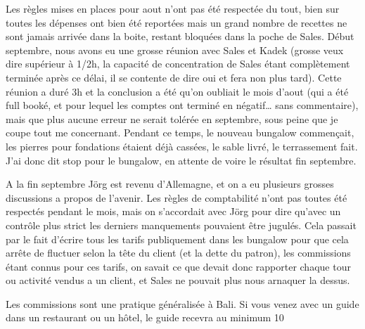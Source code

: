 Les règles mises en places pour aout n’ont pas été respectée du tout, bien sur toutes les dépenses ont bien été reportées mais un grand nombre de recettes ne sont jamais arrivée dans la boite, restant bloquées dans la poche de Sales. Début septembre, nous avons eu une grosse réunion avec Sales et Kadek (grosse veux dire supérieur à 1/2h, la capacité de concentration de Sales étant complètement terminée après ce délai, il se contente de dire oui et fera non plus tard). Cette réunion a duré 3h et la conclusion a été qu’on oubliait le mois d’aout (qui a été full booké, et pour lequel les comptes ont terminé en négatif… sans commentaire), mais que plus aucune erreur ne serait tolérée en septembre, sous peine que je coupe tout me concernant. Pendant ce temps, le nouveau bungalow commençait, les pierres pour fondations étaient déjà cassées, le sable livré, le terrassement fait. J’ai donc dit stop pour le bungalow, en attente de voire le résultat fin septembre.

A la fin septembre Jörg est revenu d’Allemagne, et on a eu plusieurs grosses discussions a propos de l’avenir. Les règles de comptabilité n’ont pas toutes été respectés pendant le mois, mais on s’accordait avec Jörg pour dire qu’avec un contrôle plus strict les derniers manquements pouvaient être jugulés. Cela passait par le fait d’écrire tous les tarifs publiquement dans les bungalow pour que cela arrête de fluctuer selon la tête du client (et la dette du patron), les commissions étant connus pour ces tarifs, on savait ce que devait donc rapporter chaque tour ou activité vendus a un client, et Sales ne pouvait plus nous arnaquer la dessus.

Les commissions sont une pratique généralisée à Bali. Si vous venez avec un guide dans un restaurant ou un hôtel, le guide recevra au minimum 10%

